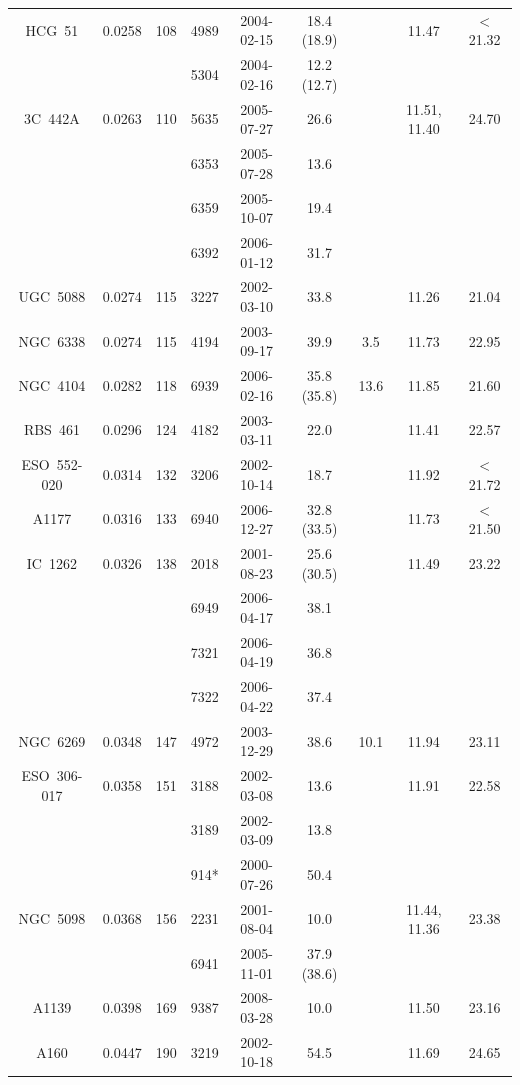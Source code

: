 \documentclass{aastex}
\begin{document}
\begin{table}
\begin{center}
{\begin{tabular}{ccccccccc}
HCG~51   & 0.0258 & 108 & 4989 & 2004-02-15 & 18.4 (18.9) & & 11.47 & $<$21.32 \\
         &        &     & 5304 & 2004-02-16 & 12.2 (12.7) & & & \\
3C~442A  & 0.0263 & 110 & 5635 & 2005-07-27 & 26.6 & & 11.51, 11.40 & 24.70 \\
         &        &     & 6353 & 2005-07-28 & 13.6 & & & \\
         &        &     & 6359 & 2005-10-07 & 19.4 & & & \\
         &        &     & 6392 & 2006-01-12 & 31.7 & & & \\
UGC~5088 & 0.0274 & 115 & 3227 & 2002-03-10 & 33.8 & & 11.26 & 21.04 \\
NGC~6338 & 0.0274 & 115 & 4194 & 2003-09-17 & 39.9 & 3.5 & 11.73 & 22.95 \\
NGC~4104 & 0.0282 & 118 & 6939 & 2006-02-16 & 35.8 (35.8) & 13.6 & 11.85 & 21.60 \\
RBS~461  & 0.0296 & 124 & 4182 & 2003-03-11 & 22.0 & & 11.41 & 22.57 \\
ESO~552-020 & 0.0314 & 132 & 3206 & 2002-10-14 & 18.7 & & 11.92 & $<$21.72 \\
A1177    & 0.0316 & 133 & 6940 & 2006-12-27 & 32.8 (33.5) & & 11.73 & $<$21.50 \\
IC~1262  & 0.0326 & 138 & 2018 & 2001-08-23 & 25.6 (30.5) & & 11.49 & 23.22 \\
         &        &     & 6949 & 2006-04-17 & 38.1 & & & \\
         &        &     & 7321 & 2006-04-19 & 36.8 & & & \\
         &        &     & 7322 & 2006-04-22 & 37.4 & & & \\
NGC~6269 & 0.0348 & 147 & 4972 & 2003-12-29 & 38.6 & 10.1 & 11.94 & 23.11 \\
ESO~306-017 & 0.0358 & 151 & 3188 & 2002-03-08 & 13.6 & & 11.91 & 22.58 \\
            &        &     & 3189 & 2002-03-09 & 13.8 & & &  \\
            &        &     &  914* & 2000-07-26 & 50.4 & & &  \\
NGC~5098 & 0.0368 & 156 & 2231 & 2001-08-04 & 10.0 & & 11.44, 11.36 & 23.38 \\
         &        &     & 6941 & 2005-11-01 & 37.9 (38.6) & & & \\
A1139 & 0.0398 & 169 & 9387 & 2008-03-28 & 10.0 & & 11.50 & 23.16 \\
A160   & 0.0447 & 190 & 3219 & 2002-10-18 & 54.5 & & 11.69 & 24.65 \\

\end{tabular}}
\end{center}
\end{table}
\end{document}
